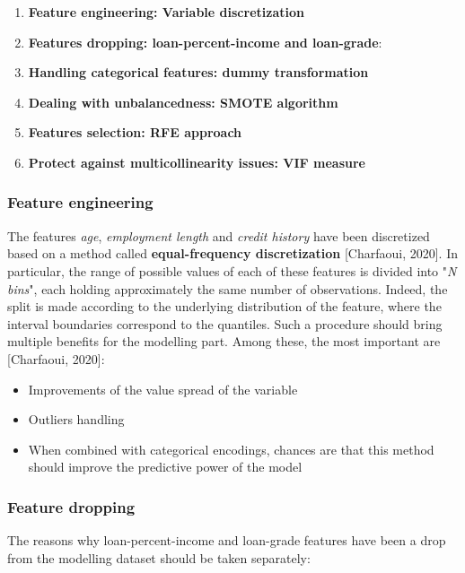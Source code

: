 \documentclass[a4paper,12pt]{article}
\begin{document}
        \begin{enumerate}
            \item \textbf{Feature engineering: Variable discretization }
            \item \textbf{Features dropping: loan-percent-income and loan-grade}:
            \item \textbf{Handling categorical features: dummy transformation}
            \item \textbf{Dealing with unbalancedness: SMOTE algorithm}
            \item \textbf{Features selection: RFE approach}
            \item \textbf{Protect against multicollinearity issues: VIF measure}
        \end{enumerate}

        \subsubsection{Feature engineering}
        The features \textit{age}, \textit{employment length} and \textit{credit history} 
        have been discretized based on a method called \textbf{equal-frequency discretization} [Charfaoui, 2020]. 
        In particular, the range of possible values of each of these features is divided into 
        "\textit{N bins}", each holding approximately the same number of observations. 
        Indeed, the split is made according to the underlying distribution of the feature, 
        where the interval boundaries correspond to the quantiles. Such a procedure should 
        bring multiple benefits for the modelling part. Among these, the most important are [Charfaoui, 2020]:

        \begin{itemize}
            \item Improvements of the value spread of the variable
            \item Outliers handling
            \item When combined with categorical encodings, chances are that this method should improve the predictive power of the model 
        \end{itemize}
        
        \subsubsection{Feature dropping}
        The reasons why loan-percent-income and loan-grade features have been a drop 
        from the modelling dataset should be taken separately:
\end{document}
